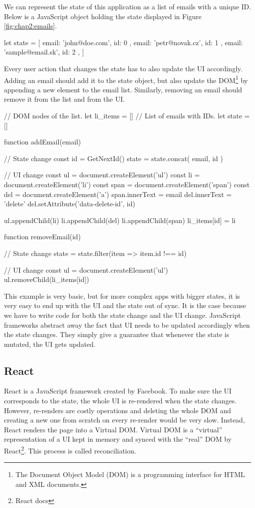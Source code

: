 We can represent the state of this application as a list of emails with a unique ID. Below is a JavaScript object holding the state displayed in
Figure \ref{fig:chap2:emails}.
\begin{code}
let state = [
    { email: 'john@doe.com', id: 0 },
    { email: 'petr@novak.cz', id: 1 },
    { email: 'sample@email.sk', id: 2 },
]
\end{code}

Every user action that changes the state has to also update the UI accordingly. Adding an email should add it to the state object, but also update
the DOM\footnote{The Document Object Model (DOM) is a programming interface for HTML and XML documents.} by appending a new element to the email list.
Similarly, removing an email should remove it from the list and from the UI.
\begin{code}
// DOM nodes of the list.
let li_items = []
// List of emails with IDs.
let state = []

function addEmail(email) {
    // State change
    const id = GetNextId()
    state = state.concat({ email, id })

    // UI change
    const ul = document.createElement('ul')
    const li = document.createElement('li')
    const span = document.createElement('span')
    const del = document.createElement('a')
    span.innerText = email
    del.innerText = 'delete'
    del.setAttribute('data-delete-id', id)

    ul.appendChild(li)
    li.appendChild(del)
    li.appendChild(span)
    li_items[id] = li
}

function removeEmail(id) {
    // State change
    state = state.filter(item => item.id !== id)

    // UI change
    const ul = document.createElement('ul')
    ul.removeChild(li_items[id])
}
\end{code}

This example is very basic, but for more complex apps with bigger states, it is very easy to end up with the UI and the state out of sync. It is the case
because we have to write code for both the state change and the UI change. JavaScript frameworks abstract away the fact that UI needs
to be updated accordingly when the state changes. They simply give a guarantee that whenever the state is mutated, the UI gets updated.

\subsection{React}
React \cite{React} is a JavaScript framework created by Facebook. To make sure the UI corresponds to the state, the whole UI is re-rendered
when the state changes. However, re-renders are costly operations and deleting the whole DOM and creating a new one from scratch on every re-render
would be very slow. Instead, React renders the page into a Virtual DOM. Virtual DOM is a “virtual” representation of a UI kept in memory and
synced with the “real” DOM by React\footnote{React docs}. This process is called reconciliation.

